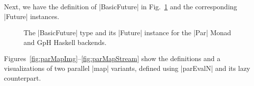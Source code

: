 Next, we have the definition of |BasicFuture| in Fig.~\ref{fig:BasicFuture} and the corresponding |Future| instances.

\begin{figure}[h]
\caption{The |BasicFuture| type and its |Future| instance for the |Par| Monad and GpH Haskell backends.}
\label{fig:BasicFuture}
\end{figure}


Figures~\ref{fig:parMapImg}--\ref{fig:parMapStream} show the definitions and a visualizations of two parallel |map| variants, defined using |parEvalN| and its lazy counterpart.

